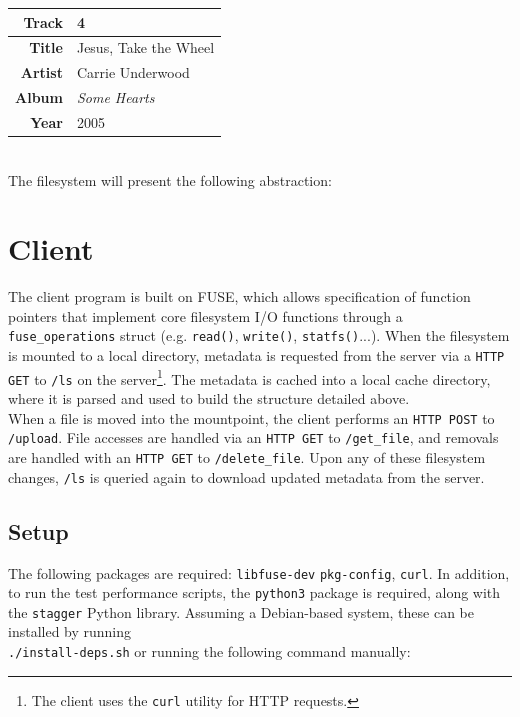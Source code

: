 \documentclass{article}
\begin{document}
	\begin{tabular}{| r | l |}
		\hline
		\textbf{Track} & 4 \\ \hline
		\textbf{Title} & Jesus, Take the Wheel \\ \hline
		\textbf{Artist} & Carrie Underwood \\ \hline
		\textbf{Album} & \textit{Some Hearts} \\ \hline 
		\textbf{Year} & 2005 \\ \hline
	\end{tabular} \\
	
	\noindent The filesystem will present the following abstraction: \\ 
	
		
	\section{Client}
	The client program is built on FUSE, which allows specification of function pointers that implement core filesystem I/O functions through a \texttt{fuse\_operations} struct (e.g. \texttt{read()}, \texttt{write()}, \texttt{statfs()}...). When the filesystem is mounted to a local directory, metadata is requested from the server via a \texttt{HTTP GET} to \texttt{/ls} on the server\footnote{The client uses the \texttt{curl} utility for HTTP requests.}. The metadata is cached into a local cache directory, where it is parsed and used to build the structure detailed above. \\
	
	\noindent When a file is moved into the mountpoint, the client performs an \texttt{HTTP POST} to \texttt{/upload}. File accesses are handled via an \texttt{HTTP GET} to \texttt{/get\_file}, and removals are handled with an \texttt{HTTP GET} to \texttt{/delete\_file}. Upon any of these filesystem changes, \texttt{/ls} is queried again to download updated metadata from the server.
	
	\subsection{Setup}
	The following packages are required: \texttt{libfuse-dev} \texttt{pkg-config}, \texttt{curl}. In addition, to run the test performance scripts, the \texttt{python3} package is required, along with the \texttt{stagger} Python library. Assuming a Debian-based system, these can be installed by running \\ \texttt{./install-deps.sh} or running the following command manually:
	
\end{document}
